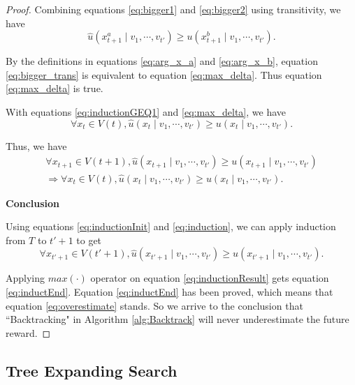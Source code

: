 \documentclass[12pt]{article}
\begin{document}
\begin{lem}
\begin{proof}
Combining equations \eqref{eq:bigger1} and \eqref{eq:bigger2} using transitivity, we have 
\begin{equation}
\label{eq:bigger_trans}
 \hat{u}( x^{a}_{t+1} \mid v_{1} , \cdots , v_{t'} ) \geq  u ( x^{b}_{t+1} \mid v_{1} , \cdots , v_{t'} ).
\end{equation}

By the definitions in equations \eqref{eq:arg_x_a} and \eqref{eq:arg_x_b}, equation \eqref{eq:bigger_trans} is equivalent to equation \eqref{eq:max_delta}. Thus equation \eqref{eq:max_delta} is true.

With equations \eqref{eq:inductionGEQ1} and \eqref{eq:max_delta}, we have
\begin{equation}
\label{eq:inductConclusion}
\forall x_{t} \in V(t), \hat{u}( x_{t} \mid v_{1} , \cdots , v_{t'} ) \geq u( x_{t} \mid v_{1} , \cdots , v_{t'} ).
\end{equation}

Thus, we have
\begin{equation}
\label{eq:induction}
\begin{aligned}
\forall x_{t+1} \in V(t+1), \hat{u}( x_{t+1} \mid v_{1} , \cdots , v_{t'} ) \geq u( x_{t+1} \mid v_{1} , \cdots , v_{t'} )  \\
\Rightarrow  \forall x_{t} \in V(t), \hat{u}( x_{t} \mid v_{1} , \cdots , v_{t'} ) \geq u( x_{t} \mid v_{1} , \cdots , v_{t'} ).
\end{aligned}
\end{equation}

\textbf{Conclusion}

Using equations \eqref{eq:inductionInit} and \eqref{eq:induction}, we can apply induction from $ T $ to $ t'+1 $ to get
\begin{equation}
\label{eq:inductionResult}
\forall x_{t'+1} \in V(t'+1), \hat{u}( x_{t'+1} \mid v_{1} , \cdots , v_{t'} ) \geq u( x_{t'+1} \mid v_{1} , \cdots , v_{t'} ).
\end{equation}

Applying $ max(\cdot) $ operator on equation \eqref{eq:inductionResult} gets equation \eqref{eq:inductEnd}.
Equation \eqref{eq:inductEnd} has been proved, which means that equation \eqref{eq:overestimate} stands.
So we arrive to the conclusion that ``Backtracking" in Algorithm \ref{alg:Backtrack} will never underestimate the future reward.

\end{proof}
\end{lem}

\subsection{Tree Expanding Search}
\label{subsec:tree_expanding_search}
\end{document}

